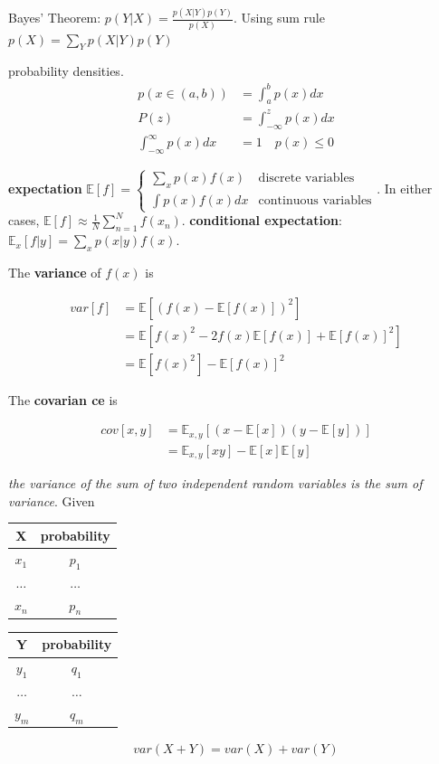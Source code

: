\documentclass[11pt]{article}
\begin{document}
Bayes' Theorem: \(p(Y|X)=\frac{p(X|Y)p(Y)}{p(X)}\). Using sum rule
\(p(X)=\displaystyle\sum_Yp(X|Y)p(Y)\)

probability densities. 
\begin{align*}
p(x\in(a,b))&=\int_a^bp(x)dx\\
P(z)&=\int_{-\infty}^z p(x)dx\\
\int_{-\infty}^\infty p(x)dx&=1\quad p(x)\le0
\end{align*}


\textbf{expectation} \(\mathbb{E}[f]=
   \begin{cases}
   \displaystyle\sum_{x}p(x)f(x) & \text{discrete variables}\\
   \int p(x)f(x)dx & \text{continuous variables}
   \end{cases}\). In either cases,
\(\mathbb{E}[f]\approx\frac{1}{N}\displaystyle\sum_{n=1}^N f(x_n)\).
\textbf{conditional expectation}: \(\mathbb{E}_x[f| y]=\displaystyle\sum_xp(x| y)f(x)\).

The \textbf{variance} of \(f(x)\) is

\begin{align*}
var[f]&=\mathbb{E}[(f(x)-\mathbb{E}[f(x)])^2]\\
&=\mathbb{E}[f(x)^2-2f(x)\mathbb{E}[f(x)]+\mathbb{E}[f(x)]^2]\\
&=\mathbb{E}[f(x)^2]-\mathbb{E}[f(x)]^2
\end{align*}


   The \textbf{covarian
ce} is

\begin{align*}
cov[x,y]&=\mathbb{E}_{x,y}[(x-\mathbb{E}[x])(y-\mathbb{E}[y])]\\
&=\mathbb{E}_{x,y}[xy]-\mathbb{E}[x]\mathbb{E}[y]
\end{align*}


\emph{the variance of the sum of two independent random variables is the sum of}
\emph{variance}. Given
\begin{center}
\begin{tabular}{c|c}
X & probability\\
\hline
\(x_1\) & \(p_1\)\\
\(\dots\) & \(\dots\)\\
\(x_n\) & \(p_n\)\\
\end{tabular}
\end{center}

\begin{center}
\begin{tabular}{c|c}
Y & probability\\
\hline
\(y_1\) & \(q_1\)\\
\(\dots\) & \(\dots\)\\
\(y_m\) & \(q_m\)\\
\end{tabular}
\end{center}
\begin{align*}
var(X+Y)=var(X)+var(Y)
\end{align*}
\end{document}
